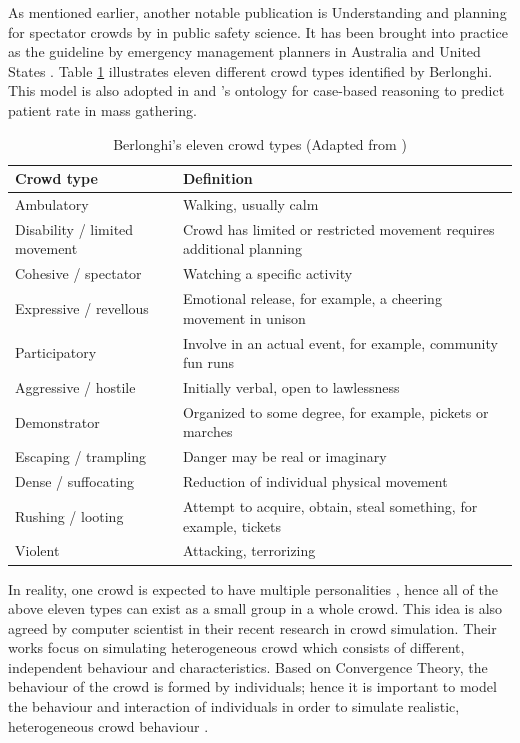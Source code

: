 As mentioned earlier, another notable publication is Understanding and planning for spectator crowds by \citet{Berlonghi1995} in public safety science. It has been brought into practice as the guideline by emergency management planners in Australia \citep{EMA1999} and United States \citep{FEMA2005}. Table \ref{table:berlonghiCrowdType} illustrates eleven different crowd types identified by Berlonghi. This model is also adopted in \citet{DelirHaghighi2013a} and \citet{Arbon2007}’s ontology for case-based reasoning to predict patient rate in mass gathering.

\begin{table}
	\caption{Berlonghi's eleven crowd types (Adapted from \citet{Zeitz2009})}
	\label{table:berlonghiCrowdType}
	\centering
	\begin{tabular}{|l|p{8cm}|}
		\hline
		\textbf{Crowd type} & \textbf{Definition} \\
		\hline
		Ambulatory & Walking, usually calm  \\
		\hline
		Disability / limited movement & Crowd has limited or restricted movement requires additional planning \\
		\hline
		Cohesive / spectator & Watching a specific activity \\
		\hline
		Expressive / revellous & Emotional release, for example, a cheering movement in unison \\
		\hline
		Participatory & Involve in an actual event, for example, community fun runs \\
		\hline
		Aggressive / hostile & Initially verbal, open to lawlessness \\
		\hline
		Demonstrator & Organized to some degree, for example, pickets or marches \\
		\hline
		Escaping / trampling & Danger may be real or imaginary \\
		\hline
		Dense / suffocating & Reduction of individual physical movement \\
		\hline
		Rushing / looting & Attempt to acquire, obtain, steal something, for example, tickets \\
		\hline
		Violent & Attacking, terrorizing \\
		\hline
	\end{tabular}
\end{table}

In reality, one crowd is expected to have multiple personalities \citep{Berlonghi1995}, hence all of the above eleven types can exist as a small group in a whole crowd. This idea is also agreed by computer scientist in their recent research in crowd simulation. Their works focus on simulating heterogeneous crowd which consists of different, independent behaviour and characteristics. Based on Convergence Theory, the behaviour of the crowd is formed by individuals; hence it is important to model the behaviour and interaction of individuals in order to simulate realistic, heterogeneous crowd behaviour \citep{Guy2011}.

